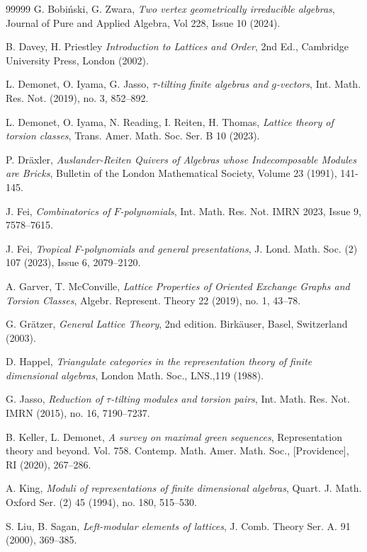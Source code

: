 \documentclass{amsart}
\theoremstyle{thmstyle}
\theoremstyle{exstyle}
\theoremstyle{defstyle}
\theoremstyle{remstyle}
\theoremstyle{remstyle}
\begin{document}
\begin{thebibliography}{99999}
     G. Bobiński, G. Zwara,
\emph{Two vertex geometrically irreducible algebras}, Journal of Pure and Applied Algebra, Vol 228, Issue 10 (2024).

     B. Davey, H. Priestley
\emph{Introduction to Lattices and Order}, 2nd Ed., Cambridge University Press, London (2002).

      L. Demonet, O. Iyama, G. Jasso,
\emph{$\tau$-tilting finite algebras and $g$-vectors},  Int. Math. Res. Not. (2019), no. 3, 852–892.

     L. Demonet, O. Iyama, N. Reading, I. Reiten, H. Thomas, 
\emph{Lattice theory of torsion classes}, Trans. Amer. Math. Soc. Ser. B 10 (2023).

     P. Dräxler, 
\emph{Auslander-Reiten Quivers of Algebras whose Indecomposable Modules are Bricks}, Bulletin of the London Mathematical Society, Volume 23 (1991), 141-145.

     J. Fei,
\emph{Combinatorics of $F$-polynomials},
Int. Math. Res. Not. IMRN 2023, Issue 9, 7578--7615.

     J. Fei, 
\emph{Tropical F-polynomials and general presentations}, 
J. Lond. Math. Soc. (2) 107 (2023), Issue 6, 2079--2120.

     A. Garver, T. McConville, 
\emph{Lattice Properties of Oriented Exchange Graphs and Torsion Classes}, Algebr. Represent. Theory 22 (2019), no. 1, 43–78.

     G. Grätzer, 
\emph{General Lattice Theory}, 2nd edition. Birkäuser, Basel, Switzerland (2003).

     D. Happel, 
\emph{Triangulate categories in the representation theory of finite dimensional algebras}, London Math. Soc., LNS.,119 (1988).

     G. Jasso, 
\emph{Reduction of $\tau$-tilting modules and torsion pairs}, Int. Math. Res. Not. IMRN (2015), no. 16, 7190–7237.

     B. Keller, L. Demonet, 
\emph{A survey on maximal green sequences}, Representation theory and beyond. Vol. 758. Contemp. Math. Amer. Math. Soc., [Providence], RI (2020), 267–286.

      A. King, \emph{Moduli of representations of finite dimensional algebras}, Quart. J. Math. Oxford Ser. (2) 45 (1994), no. 180, 515--530.

     S. Liu, B. Sagan,
\emph{Left-modular elements of lattices}, J. Comb. Theory Ser. A. 91 (2000), 369–385.


\end{thebibliography}
\end{document}
